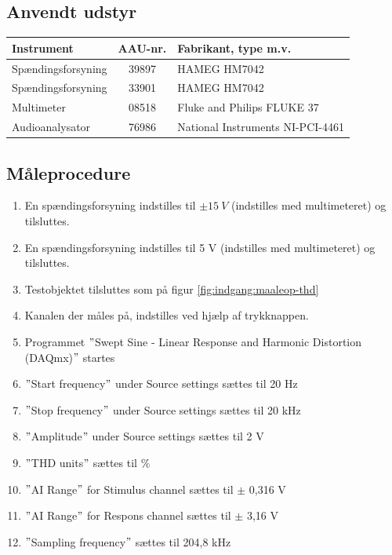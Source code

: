 \subsection*{Anvendt udstyr}

\begin{table}[h]
\centering
\begin{tabular}{l|c|l}
\hline\hline
Instrument & AAU-nr. & Fabrikant, type m.v. \\
\hline\hline
Spændingsforsyning & 39897 & HAMEG HM7042 \\[4pt]
Spændingsforsyning & 33901 & HAMEG HM7042 \\[4pt]
Multimeter & 08518 & Fluke and Philips FLUKE 37 \\[4pt]
Audioanalysator & 76986 & National Instruments NI-PCI-4461 \\
\hline\hline
\end{tabular}
\label{tab:indgang:maaleudstyr_forforstaerker}
\end{table}

\subsection*{Måleprocedure}
\begin{enumerate}
\item En spændingsforsyning indstilles til $\pm15~V$ (indstilles med multimeteret) og tilsluttes.
\item En spændingsforsyning indstilles til 5 V (indstilles med multimeteret) og tilsluttes.
\item Testobjektet tilsluttes som på figur \ref{fig:indgang:maaleop-thd}
\item Kanalen der måles på, indstilles ved hjælp af trykknappen.
\item Programmet $"$Swept Sine - Linear Response and Harmonic Distortion (DAQmx)$"$ startes
\item $"$Start frequency$"$ under Source settings sættes til 20 Hz
\item $"$Stop frequency$"$ under Source settings sættes til 20 kHz
\item $"$Amplitude$"$ under Source settings sættes til 2 V
\item $"$THD units$"$ sættes til \%
\item $"$AI Range$"$ for Stimulus channel sættes til $\pm$ 0,316 V
\item $"$AI Range$"$ for Respons channel sættes til $\pm$ 3,16 V
\item $"$Sampling frequency$"$ sættes til 204,8 kHz
\end{enumerate}

